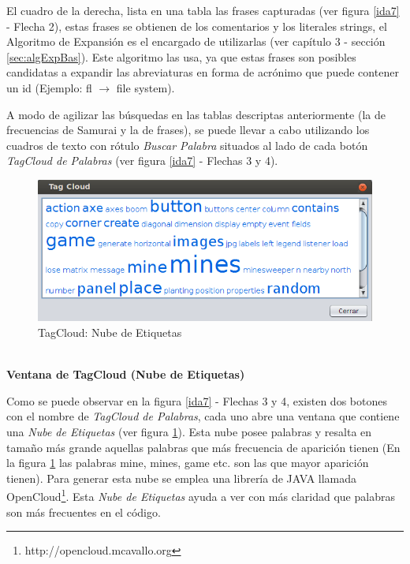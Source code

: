 El cuadro de la derecha, lista en una tabla las frases capturadas (ver figura \ref{ida7} - Flecha 2), estas frases se obtienen de los comentarios y los literales strings, el Algoritmo de Expansión es el encargado de utilizarlas (ver capítulo 3 - sección \ref{sec:algExpBas}). Este algoritmo las usa, ya que estas frases son posibles candidatas a expandir las abreviaturas en forma de acrónimo que puede contener un id (Ejemplo: \textsf{fl} $\rightarrow$ \textsf{file system}).

A modo de agilizar las búsquedas en las tablas descriptas anteriormente (la de frecuencias de Samurai y la de frases), se puede llevar a cabo utilizando los cuadros de texto con rótulo \textit{Buscar Palabra} situados al lado de cada botón \textit{TagCloud de Palabras} (ver figura \ref{ida7} - Flechas 3 y 4).

\begin{figure}[t] %
\centerline{%
\includegraphics[scale= 0.75]{./cap4/ida_08.png}
}
\caption{TagCloud: Nube de Etiquetas}
\label{ida8}
\end{figure}

\noindent \textbf{\\Ventana de TagCloud (Nube de Etiquetas)\\} 

Como se puede observar en la figura \ref{ida7} - Flechas 3 y 4, existen dos botones con el nombre de \textit{TagCloud de Palabras}, cada uno abre una ventana que contiene una \textit{Nube de Etiquetas} (ver figura \ref{ida8}). Esta nube posee palabras y resalta en tamaño más grande aquellas palabras que más frecuencia de aparición tienen (En la figura \ref{ida8} las palabras \textsf{mine}, \textsf{mines}, \textsf{game} etc. son las que mayor aparición tienen). Para generar esta nube se emplea una librería de JAVA llamada OpenCloud\footnote[1]{http://opencloud.mcavallo.org}.
Esta \textit{Nube de Etiquetas} ayuda a ver con más claridad que palabras son más frecuentes en el código. 

